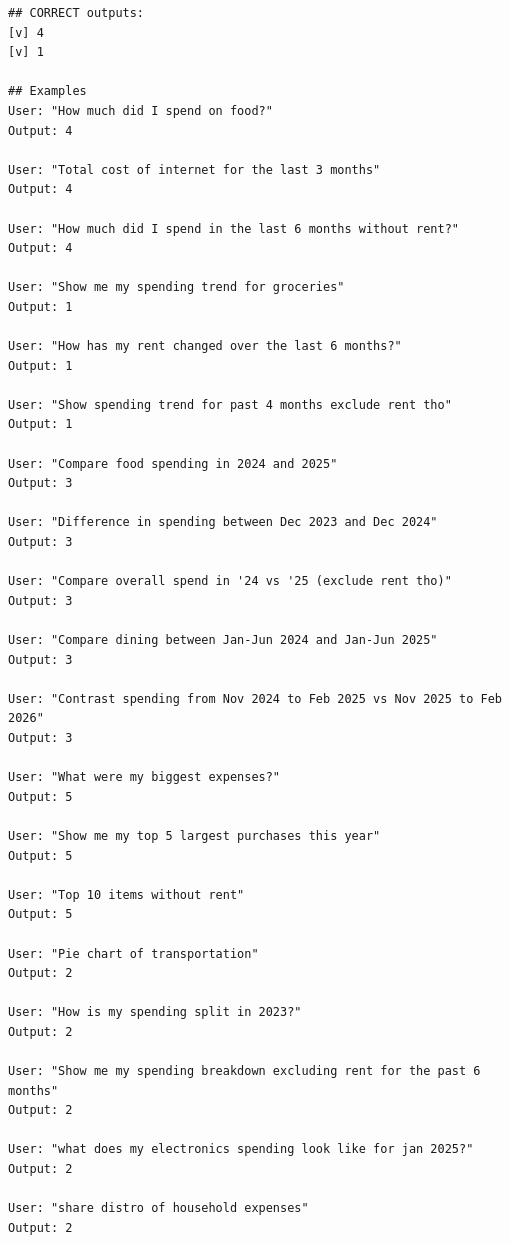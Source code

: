 \documentclass[11pt,twocolumn]{article}
\begin{document}
\begin{scriptsize}
\begin{verbatim}
## CORRECT outputs:
[v] 4
[v] 1

## Examples
User: "How much did I spend on food?"
Output: 4

User: "Total cost of internet for the last 3 months"
Output: 4

User: "How much did I spend in the last 6 months without rent?"
Output: 4

User: "Show me my spending trend for groceries"
Output: 1

User: "How has my rent changed over the last 6 months?"
Output: 1

User: "Show spending trend for past 4 months exclude rent tho"
Output: 1

User: "Compare food spending in 2024 and 2025"
Output: 3

User: "Difference in spending between Dec 2023 and Dec 2024"
Output: 3

User: "Compare overall spend in '24 vs '25 (exclude rent tho)"
Output: 3

User: "Compare dining between Jan-Jun 2024 and Jan-Jun 2025"
Output: 3

User: "Contrast spending from Nov 2024 to Feb 2025 vs Nov 2025 to Feb 2026"
Output: 3

User: "What were my biggest expenses?"
Output: 5

User: "Show me my top 5 largest purchases this year"
Output: 5

User: "Top 10 items without rent"
Output: 5

User: "Pie chart of transportation"
Output: 2

User: "How is my spending split in 2023?"
Output: 2

User: "Show me my spending breakdown excluding rent for the past 6 months"
Output: 2

User: "what does my electronics spending look like for jan 2025?"
Output: 2

User: "share distro of household expenses"
Output: 2
\end{verbatim}
\end{scriptsize}
\end{document}
